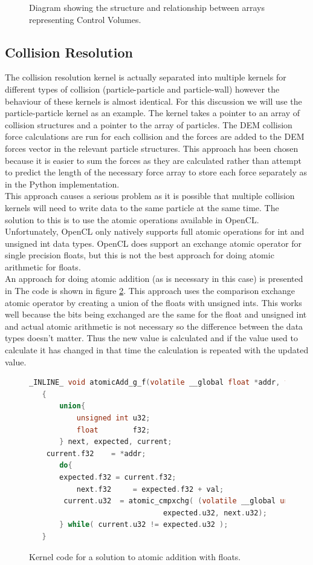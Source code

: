 \documentclass[10pt,a4paper,titlepage]{report}
\begin{document}
\begin{figure}[!ht]

\caption{Diagram showing the structure and relationship between arrays representing Control Volumes.}
\label{fig:cv_array_structure}
\end{figure}

\subsection{Collision Resolution}
The collision resolution kernel is actually separated into multiple kernels for different types of collision (particle-particle and particle-wall) however the behaviour of these kernels is almost identical. For this discussion we will use the particle-particle kernel as an example. The kernel takes a pointer to an array of collision structures and a pointer to the array of particles. The DEM collision force calculations are run for each collision and the forces are added to the DEM forces vector in the relevant particle structures. This approach has been chosen because it is easier to sum the forces as they are calculated rather than attempt to predict the length of the necessary force array to store each force separately as in the Python implementation.
\\This approach causes a serious problem as it is possible that multiple collision kernels will need to write data to the same particle at the same time. The solution to this is to use the atomic operations available in OpenCL. Unfortunately, OpenCL only natively supports full atomic operations for int and unsigned int data types. OpenCL does support an exchange atomic operator for single precision floats, but this is not the best approach for doing atomic arithmetic for floats.
\\An approach for doing atomic addition (as is necessary in this case) is presented in %
The code is shown in figure \ref{fig:atomic_float_addition}. This approach uses the comparison exchange atomic operator by creating a union of the floats with unsigned ints. This works well because the bits being exchanged are the same for the float and unsigned int and actual atomic arithmetic is not necessary so the difference between the data types doesn't matter. Thus the new value is calculated and if the value used to calculate it has changed in that time the calculation is repeated with the updated value.
\begin{figure}[!ht]
\begin{lstlisting}[language=C]
 _INLINE_ void atomicAdd_g_f(volatile __global float *addr, float val)
   {
       union{
           unsigned int u32;
           float        f32;
       } next, expected, current;
   	current.f32    = *addr;
       do{
   	   expected.f32 = current.f32;
           next.f32     = expected.f32 + val;
   		current.u32  = atomic_cmpxchg( (volatile __global unsigned int *)addr, 
                               expected.u32, next.u32);
       } while( current.u32 != expected.u32 );
   }
\end{lstlisting}
\caption{Kernel code for a solution to atomic addition with floats.}
\label{fig:atomic_float_addition}
\end{figure}
\end{document}
